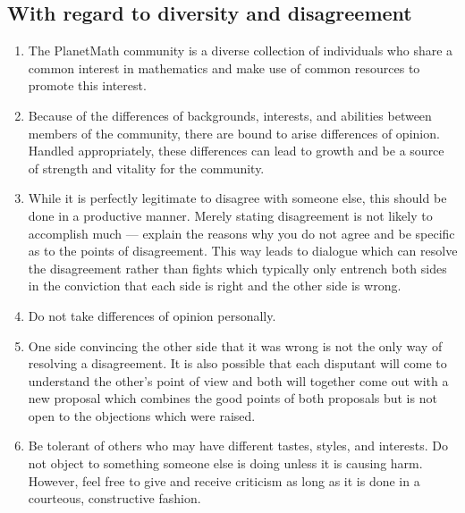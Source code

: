 \subsection{With regard to diversity and disagreement}
\begin{enumerate}
\item The PlanetMath community is a diverse collection of individuals who
share a common interest in mathematics and make use of common
resources to promote this interest.
\item Because of the differences of backgrounds, interests, and abilities
between members of the community, there are bound to arise differences
of opinion. Handled appropriately, these differences can lead to
growth and be a source of strength and vitality for the community.
\item While it is perfectly legitimate to disagree with someone else, this
should be done in a productive manner. Merely stating disagreement is
not likely to accomplish much --- explain the reasons why you do not
agree and be specific as to the points of disagreement. This way
leads to dialogue which can resolve the disagreement rather than
fights which typically only entrench both sides in the conviction that
each side is right and the other side is wrong.
\item Do not take differences of opinion personally.
\item One side convincing the other side that it was wrong is not the only
way of resolving a disagreement. It is also possible that each
disputant will come to understand the other's point of view and both
will together come out with a new proposal which combines the good
points of both proposals but is not open to the objections which were
raised.
\item Be tolerant of others who may have different tastes, styles, and
interests. Do not object to something someone else is doing unless it
is causing harm. However, feel free to give and receive criticism as
long as it is done in a courteous, constructive fashion.
\end{enumerate}

